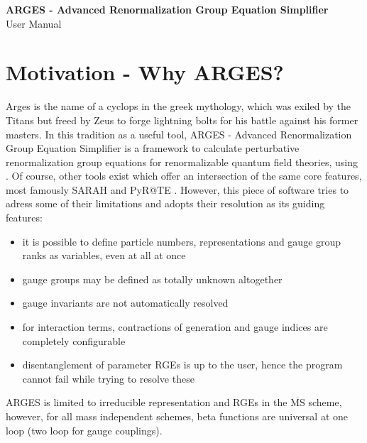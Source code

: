 \documentclass{scrartcl}
\begin{document}
\begin{titlepage}
\centering
{\LARGE \bfseries ARGES - Advanced Renormalization Group Equation Simplifier}\\
\vspace{20em}
\LARGE User Manual
\end{titlepage}
\newpage
\tableofcontents
\thispagestyle{empty}
\newpage
\section{Motivation - Why ARGES?}
Arges is the name of a cyclops in the greek mythology, which was exiled by the Titans but freed by Zeus to forge lightning bolts for his battle against his former masters. \newline
In this tradition as a useful tool, ARGES - Advanced Renormalization Group Equation Simplifier is a framework to calculate perturbative renormalization group equations for renormalizable quantum field theories, using \cite{LuoWangXiao,MV1,MV2,MV3,vev1,vev2,OsbornJack,OsbornJack2,OsbornJack3,Decoding}. Of course, other tools exist which offer an intersection of the same core features, most famously SARAH \cite{SARAH,SARAH4} and PyR@TE \cite{pyrate,pyrate2}. However, this piece of software tries to adress some of their limitations and adopts their resolution as its guiding features:
\begin{itemize}
\item it is possible to define particle numbers, representations and gauge group ranks as variables, even at all at once
\item gauge groups may be defined as totally unknown altogether
\item gauge invariants are not automatically resolved
\item for interaction terms, contractions of generation and gauge indices are completely configurable
\item disentanglement of parameter RGEs is up to the user, hence the program cannot fail while trying to resolve these
\end{itemize}
ARGES is limited to irreducible representation and RGEs in the $\overline{\mathrm{MS}}$ scheme, however, for all mass independent schemes, beta functions are universal at one loop (two loop for gauge couplings).
\newpage
\end{document}

